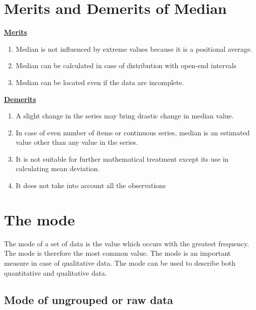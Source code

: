 \documentclass[
]{book}
\begin{document}
\hypertarget{merits-and-demerits-of-median}{%
\section{Merits and Demerits of Median}\label{merits-and-demerits-of-median}}

\underline{\textbf{Merits}}

\begin{enumerate}
\def\labelenumi{\arabic{enumi}.}
\item
  Median is not influenced by extreme values because it is a
  positional average.
\item
  Median can be calculated in case of distribution with open-end
  intervals
\item
  Median can be located even if the data are incomplete.
\end{enumerate}

\underline{\textbf{Demerits}}

\begin{enumerate}
\def\labelenumi{\arabic{enumi}.}
\item
  A slight change in the series may bring drastic change in median
  value.
\item
  In case of even number of items or continuous series, median is an
  estimated value other than any value in the series.
\item
  It is not suitable for further mathematical treatment except its use
  in calculating mean deviation.
\item
  It does not take into account all the observations
\end{enumerate}

\hypertarget{the-mode}{%
\section{The mode}\label{the-mode}}

The mode of a set of data is the value which occurs with the greatest
frequency. The mode is therefore the most common value. The mode is an
important measure in case of qualitative data. The mode can be used to
describe both quantitative and qualitative data.

\hypertarget{mode-of-ungrouped-or-raw-data}{%
\subsection{Mode of ungrouped or raw data}\label{mode-of-ungrouped-or-raw-data}}
\end{document}
